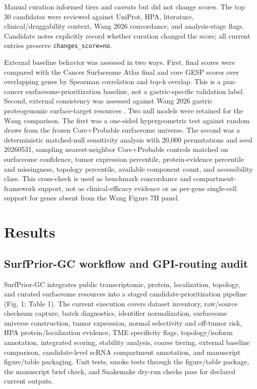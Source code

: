 \documentclass[review,12pt,authoryear]{elsarticle}
\begin{document}
Manual curation informed tiers and caveats but did not change scores. The top 30 candidates were reviewed against UniProt, HPA, literature, clinical/\allowbreak{}druggability context, Wang 2026 concordance, and analysis-stage flags. Candidate notes explicitly record whether curation changed the score;\allowbreak{} all current entries preserve \texttt{changes\_\allowbreak{}score=no}.

External baseline behavior was assessed in two ways. First, final scores were compared with the Cancer Surfaceome Atlas final and core GESP scores \citep{hu2021surfaceome} over overlapping genes by Spearman correlation and top-k overlap. This is a pan-cancer surfaceome-prioritization baseline, not a gastric-specific validation label. Second, external consistency was assessed against Wang 2026 gastric proteogenomic surface-target resources \citep{wang2026gastric}. Two null models were retained for the Wang comparison. The first was a one-sided hypergeometric test against random draws from the frozen Core+\allowbreak{}Probable surfaceome universe. The second was a deterministic matched-null sensitivity analysis with 20,000 permutations and seed 20260531, sampling nearest-neighbor Core+\allowbreak{}Probable controls matched on surfaceome confidence, tumor expression percentile, protein-evidence percentile and missingness, topology percentile, available component count, and accessibility class. This cross-check is used as benchmark concordance and compartment-framework support, not as clinical-efficacy evidence or as per-gene single-cell support for genes absent from the Wang Figure 7H panel.

\FloatBarrier
\section{Results}

\subsection{SurfPrior-GC workflow and GPI-routing audit}

SurfPrior-GC integrates public transcriptomic, protein, localization, topology, and curated surfaceome resources into a staged candidate-prioritization pipeline (Fig. 1;\allowbreak{} Table 1). The current execution covers dataset inventory, raw/\allowbreak{}source checksum capture, batch diagnostics, identifier normalization, surfaceome universe construction, tumor expression, normal selectivity and off-tumor risk, HPA protein/\allowbreak{}localization evidence, TME specificity flags, topology/\allowbreak{}isoform annotation, integrated scoring, stability analysis, coarse tiering, external baseline comparison, candidate-level scRNA compartment annotation, and manuscript figure/\allowbreak{}table packaging. Unit tests, smoke tests through the figure/\allowbreak{}table package, the manuscript brief check, and Snakemake dry-run checks pass for declared current outputs.
\end{document}
